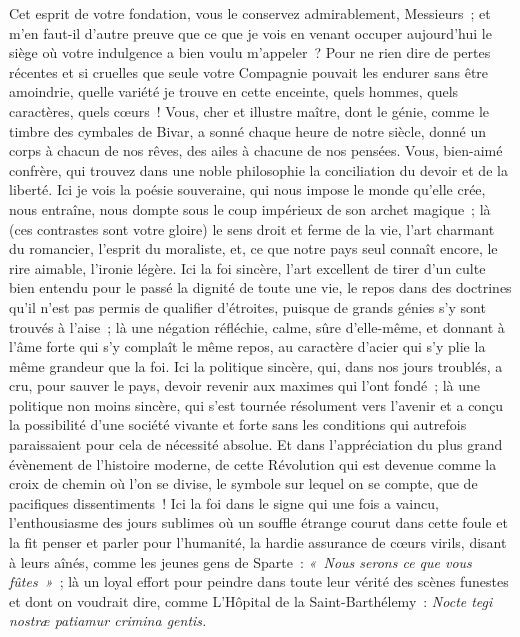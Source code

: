 \documentclass[french,twoside]{book} %
\newcommand\orgName[1]{#1}
\newcommand\persName[1]{#1}
\newcommand\placeName[1]{#1}
\begin{document}
Cet esprit de votre fondation, vous le conservez admirablement, Messieurs ; et m’en faut-il d’autre preuve que ce que je vois en venant occuper aujourd’hui le siège où votre indulgence a bien voulu m’appeler ? Pour ne rien dire de pertes récentes et si cruelles que seule votre {\orgName Compagnie} pouvait les endurer sans être amoindrie, quelle variété je trouve en cette enceinte, quels hommes, quels caractères, quels cœurs ! Vous, cher et illustre maître, dont le génie, comme le timbre des cymbales de {\persName Bivar}, a sonné chaque heure de notre siècle, donné un corps à chacun de nos rêves, des ailes à chacune de nos pensées. Vous, bien-aimé confrère, qui trouvez dans une noble philosophie la conciliation du devoir et de la liberté. Ici je vois la poésie souveraine, qui nous impose le monde qu’elle crée, nous entraîne, nous dompte sous le coup impérieux de son archet magique ; là (ces contrastes sont votre gloire) le sens droit et ferme de la vie, l’art charmant du romancier, l’esprit du moraliste, et, ce que notre pays seul connaît encore, le rire aimable, l’ironie légère. Ici la foi sincère, l’art excellent de tirer d’un culte bien entendu pour le passé la dignité de toute une vie, le repos dans des doctrines qu’il n’est pas permis de qualifier d’étroites, puisque de grands génies s’y sont trouvés à l’aise ; là une négation réfléchie, calme, sûre d’elle-même, et donnant à l’âme forte qui s’y complaît le même repos, au caractère d’acier qui s’y plie la même grandeur que la foi. Ici la politique sincère, qui, dans nos jours troublés, a cru, pour sauver le pays, devoir revenir aux maximes qui l’ont fondé ; là une politique non moins sincère, qui s’est tournée résolument vers l’avenir et a conçu la possibilité d’une société vivante et forte sans les conditions qui autrefois paraissaient pour cela de nécessité absolue. Et dans l’appréciation du plus grand évènement de l’histoire moderne, de cette Révolution qui est devenue comme la croix de chemin où l’on se divise, le symbole sur lequel on se compte, que de pacifiques dissentiments ! Ici la foi dans le signe qui une fois a vaincu, l’enthousiasme des jours sublimes où un souffle étrange courut dans cette foule et la fit penser et parler pour l’humanité, la hardie assurance de cœurs virils, disant à leurs aînés, comme les jeunes gens de {\placeName Sparte} : \emph{« Nous serons ce que vous fûtes »} ; là un loyal effort pour peindre dans toute leur vérité des scènes funestes et dont on voudrait dire, comme L’Hôpital de la Saint-Barthélemy : \emph{Nocte tegi nostræ patiamur crimina gentis.}\par
\end{document}
